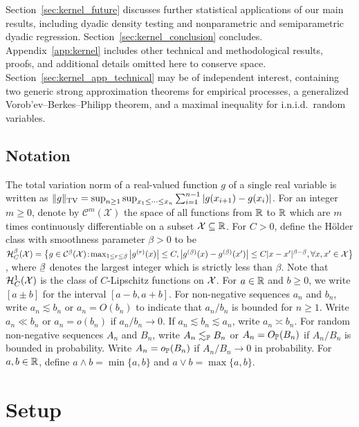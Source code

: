 Section~\ref{sec:kernel_future} discusses further statistical applications
of our main
results, including dyadic density testing and nonparametric and
semiparametric dyadic regression. Section~\ref{sec:kernel_conclusion} concludes.
Appendix~\ref{app:kernel} includes other technical and methodological results,
proofs, and additional details omitted here to conserve space.
Section~\ref{sec:kernel_app_technical} may be of independent interest,
containing
two generic strong approximation theorems for empirical processes, a
generalized Vorob'ev--Berkes--Philipp theorem, and a maximal inequality for
i.n.i.d.\ random variables.

\subsection{Notation}

The total variation norm of a
real-valued function $g$ of a single real variable is written as
$\|g\|_\TV = \sup_{n \geq 1} \sup_{x_1 \leq \cdots \leq x_n}
\sum_{i=1}^{n-1} |g(x_{i+1}) - g(x_i)|$.
For an integer $m\geq 0$, denote by $\mathcal{C}^m(\mathcal{X})$
the space of all functions from $\R$ to $\R$
which are $m$ times continuously differentiable on
a subset $\mathcal{X} \subseteq \R$.
For $C>0$, define the H\"{o}lder class with smoothness parameter
$\beta > 0$ to be
$\cH^\beta_C(\cX) =
\big\{
  g \in \cC^{\flbeta}(\cX) \! : \!
  \max_{1 \leq r \leq \flbeta}
  \big| g^{(r)}(x) \big| \leq C,
  \big| g^{(\flbeta)}(x) - g^{(\flbeta)}(x') \big|
  \leq C |x-x'|^{\beta - \flbeta},
  \forall x, x' \in \cX
\big\}$,
where $\flbeta$ denotes the largest integer which is strictly less than $\beta$.
Note that $\cH^1_C(\cX)$ is the class of $C$-Lipschitz functions on $\cX$.
For $a \in \R$ and $b \geq 0$, we write $[a \pm b]$ for the interval
$[a-b, a+b]$. For non-negative sequences $a_n$ and $b_n$, write
$a_n \lesssim b_n$ or $a_n = O(b_n)$ to indicate that
$a_n / b_n$ is bounded for $n\geq 1$.
Write $a_n \ll b_n$ or $a_n = o(b_n)$ if $a_n / b_n \to 0$.
If $a_n \lesssim b_n \lesssim a_n$, write $a_n \asymp b_n$.
For random non-negative sequences $A_n$ and $B_n$, write
$A_n \lesssim_\P B_n$ or $A_n = O_\P(B_n)$ if
$A_n / B_n$ is bounded in probability.
Write $A_n = o_\P(B_n)$ if $A_n / B_n \to 0$ in probability.
For $a,b \in \R$, define $a\wedge b=\min\{a,b\}$ and $a \vee b = \max\{a,b\}$.

\section{Setup}\label{sec:kernel_setup}

